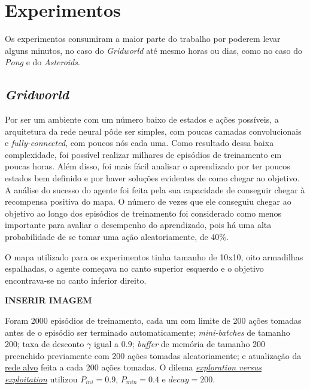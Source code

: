 \section{Experimentos}
\label{sec:exp}

Os experimentos consumiram a maior parte do trabalho por poderem levar alguns minutos, no caso do \textit{Gridworld} até mesmo horas ou dias, como no caso do \textit{Pong} e do \textit{Asteroids}.

\subsection{\textit{Gridworld}}
\label{sec:exp_gridworld}

Por ser um ambiente com um número baixo de estados e ações possíveis, a arquitetura da rede neural pôde ser simples, com poucas camadas convolucionais e \textit{fully-connected}, com poucos nós cada uma.
Como resultado dessa baixa complexidade, foi possível realizar milhares de episódios de treinamento em poucas horas.
Além disso, foi mais fácil analisar o aprendizado por ter poucos estados bem definido e por haver soluções evidentes de como chegar ao objetivo.
A análise do sucesso do agente foi feita pela sua capacidade de conseguir chegar à recompensa positiva do mapa.
O número de vezes que ele conseguiu chegar ao objetivo ao longo dos episódios de treinamento foi considerado como menos importante para avaliar o desempenho do aprendizado, pois há uma alta probabilidade de se tomar uma ação aleatoriamente, de 40\%.

O mapa utilizado para os experimentos tinha tamanho de 10x10, oito armadilhas espalhadas, o agente começava no canto superior esquerdo e o objetivo encontrava-se no canto inferior direito.

\textbf{INSERIR IMAGEM}

Foram 2000 episódios de treinamento, cada um com limite de 200 ações tomadas antes de o episódio ser terminado automaticamente;
\textit{mini-batches} de tamanho 200;
taxa de desconto $\gamma$ igual a $0.9$; 
\textit{buffer} de memória de tamanho 200 preenchido previamente com 200 ações tomadas aleatoriamente;
e atualização da \hyperref[sec:ft]{rede alvo} feita a cada 200 ações tomadas.
O dilema \hyperref[eq:exp_exp_prob]{\textit{exploration versus exploitation}} utilizou $P_{ini} = 0.9$, $P_{min} = 0.4$ e $decay = 200$.

